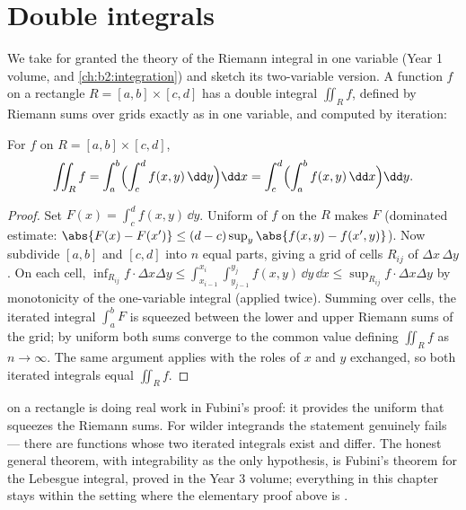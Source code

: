 \section{Double integrals}

We take for granted the theory of the Riemann integral in one
variable (Year 1 volume, and \cref{ch:b2:integration}) and sketch
its two-variable version. A function $f$  on a rectangle
$R = [a, b] \times [c, d]$ has a double integral $\iint_R f$,
defined by Riemann sums over grids exactly as in one variable, and
computed by iteration:

\begin{theorem}\label{thm:b2:multint:fubini}
For $f$  on $R = [a,b] \times [c,d]$,
\[
\iint_R f
= \int_a^b \Bigl(\int_c^d f(x, y)\,\dd y\Bigr)\dd x
= \int_c^d \Bigl(\int_a^b f(x, y)\,\dd x\Bigr)\dd y .
\]
\end{theorem}

\begin{proof}
Set $F(x) = \int_c^d f(x, y)\,\dd y$. Uniform  of $f$ on
the  $R$ makes $F$  (dominated estimate:
$\abs{F(x) - F(x')} \leq (d - c)\sup_y\abs{f(x,y) - f(x',y)}$).
Now subdivide $[a,b]$ and $[c,d]$ into $n$ equal parts, giving a
grid of cells $R_{ij}$ of  $\Delta x\,\Delta y$. On each cell,
$\inf_{R_{ij}} f \cdot \Delta x \Delta y \leq
\int_{x_{i-1}}^{x_i}\int_{y_{j-1}}^{y_j} f(x,y)\,\dd y\,\dd x \leq
\sup_{R_{ij}} f \cdot \Delta x \Delta y$ by monotonicity of the
one-variable integral (applied twice). Summing over cells, the
iterated integral $\int_a^b F$ is squeezed between the lower and
upper Riemann sums of the grid; by uniform  both sums
converge to the common value defining $\iint_R f$ as $n \to
\infty$. The same argument applies with the roles of $x$ and $y$
exchanged, so both iterated integrals equal $\iint_R f$.
\end{proof}

\begin{remark}
 on a  rectangle is doing real work in
Fubini's proof: it provides the uniform  that
squeezes the Riemann sums. For wilder integrands the
statement genuinely fails --- there are functions whose two
iterated integrals exist and differ. The honest general
theorem, with integrability as the only hypothesis, is
Fubini's theorem for the Lebesgue integral, proved in the
Year 3 volume; everything in this chapter stays within the
 setting where the elementary proof above is
.
\end{remark}

